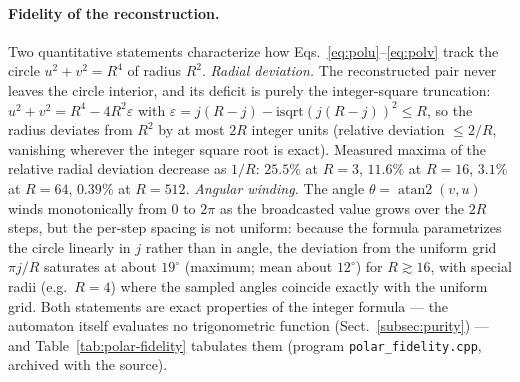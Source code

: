 \documentclass{ijuc}
\begin{document}
\paragraph{Fidelity of the reconstruction.}  Two quantitative statements characterize how Eqs.~\eqref{eq:polu}--\eqref{eq:polv} track the circle $u^{2}+v^{2}=R^{4}$ of radius $R^{2}$.  \emph{Radial deviation.}  The reconstructed pair never leaves the circle interior, and its deficit is purely the integer-square truncation: $u^{2}+v^{2}=R^{4}-4R^{2}\varepsilon$ with $\varepsilon=j(R-j)-\mathrm{isqrt}(j(R-j))^{2}\le R$, so the radius deviates from $R^{2}$ by at most $2R$ integer units (relative deviation $\le2/R$, vanishing wherever the integer square root is exact).  Measured maxima of the relative radial deviation decrease as $1/R$: $25.5\%$ at $R=3$, $11.6\%$ at $R=16$, $3.1\%$ at $R=64$, $0.39\%$ at $R=512$.  \emph{Angular winding.}  The angle $\theta=\operatorname{atan2}(v,u)$ winds monotonically from $0$ to $2\pi$ as the broadcasted value grows over the $2R$ steps, but the per-step spacing is not uniform: because the formula parametrizes the circle linearly in $j$ rather than in angle, the deviation from the uniform grid $\pi j/R$ saturates at about $19^{\circ}$ (maximum; mean about $12^{\circ}$) for $R\gtrsim16$, with special radii (e.g.\ $R=4$) where the sampled angles coincide exactly with the uniform grid.  Both statements are exact properties of the integer formula --- the automaton itself evaluates no trigonometric function (Sect.~\ref{subsec:purity}) --- and Table~\ref{tab:polar-fidelity} tabulates them (program \texttt{polar\_fidelity.cpp}, archived with the source).
\end{document}
